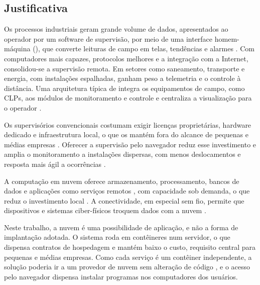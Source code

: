 \subsection{Justificativa}

\par Os processos industriais geram grande volume de dados, apresentados ao operador por um software de supervisão, por meio de uma interface homem-máquina (), que converte leituras de campo em telas, tendências e alarmes \cite{ZANGHI2019_SCADA_CONCEITOS}. Com computadores mais capazes, protocolos melhores e a integração com a Internet, consolidou-se a supervisão remota. Em setores como saneamento, transporte e energia, com instalações espalhadas, ganham peso a telemetria e o controle à distância. Uma arquitetura típica de  integra os equipamentos de campo, como CLPs, aos módulos de monitoramento e controle e centraliza a visualização para o operador \cite{AHMED2011_EFFICIENT_WEB_SCADA}.

\par Os supervisórios convencionais costumam exigir licenças proprietárias, hardware dedicado e infraestrutura local, o que os mantém fora do alcance de pequenas e médias empresas \cite{PHUYAL2020_COST_EFFICIENT_SCADA}. Oferecer a supervisão pelo navegador reduz esse investimento e amplia o monitoramento a instalações dispersas, com menos deslocamentos e resposta mais ágil a ocorrências \cite{AHMED2011_EFFICIENT_WEB_SCADA}.

\par A computação em nuvem oferece armazenamento, processamento, bancos de dados e aplicações como serviços remotos \cite{PEDROSA2011_COMPUTACAO_NUVEM}, com capacidade sob demanda, o que reduz o investimento local \cite{HENRIQUES2010_CLOUD_COMPUTING_TCC}. A conectividade, em especial sem fio, permite que dispositivos e sistemas ciber-físicos troquem dados com a nuvem \cite{STANKOVIC2014_IOT_RESEARCH_DIRECTIONS,MONOSTORI2016_CPS_MANUFACTURING}.

\par Neste trabalho, a nuvem é uma possibilidade de aplicação, e não a forma de implantação adotada. O sistema roda em contêineres num servidor, o que dispensa contratos de hospedagem e mantém baixo o custo, requisito central para pequenas e médias empresas. Como cada serviço é um contêiner independente, a solução poderia ir a um provedor de nuvem sem alteração de código \cite{NETTO2017_COORDENACAO_CONTAINERS_KUBERNETES,NETTO2016_STATE_MACHINE_REPLICATION_KUBERNETES}, e o acesso pelo navegador dispensa instalar programas nos computadores dos usuários.
